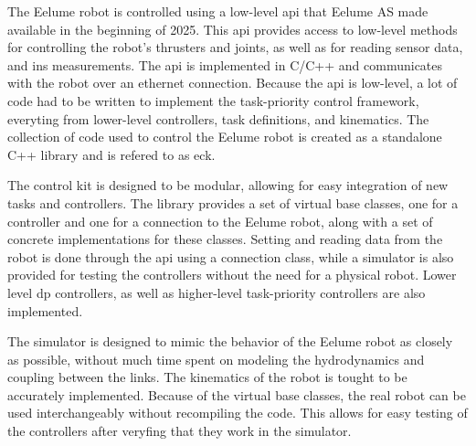 The Eelume robot is controlled using a low-level \gls{api} that Eelume AS made
available in the beginning of 2025. This api provides access to low-level methods
for controlling the robot's thrusters and joints, as well as for reading sensor
data, and \gls{ins} measurements. The \gls{api} is implemented in C/C++ and communicates with the robot over
an ethernet connection. Because the \gls{api} is low-level, a lot of code had
to be written to implement the task-priority control framework, everyting from
lower-level controllers, task definitions, and kinematics. The collection of
code used to control the Eelume robot is created as a standalone C++ library
and is refered to as \gls{eck}.

The control kit is designed to be modular, allowing for easy integration of
new tasks and controllers. The library provides a set of virtual base classes,
one for a controller and one for a connection to the Eelume robot, along with
a set of concrete implementations for these classes. Setting and reading data
from the robot is done through the \gls{api} using a connection class, while 
a simulator is also provided for testing the controllers without the need for
a physical robot. Lower level \gls{dp} controllers, as well as higher-level
task-priority controllers are also implemented.

The simulator is designed to mimic the behavior of the Eelume robot as closely
as possible, without much time spent on modeling the hydrodynamics and coupling
between the links. The kinematics of the robot is tought to be accurately
implemented. Because of the virtual base classes, the real robot can be used
interchangeably without recompiling the code. This allows for easy testing of
the controllers after veryfing that they work in the simulator.

